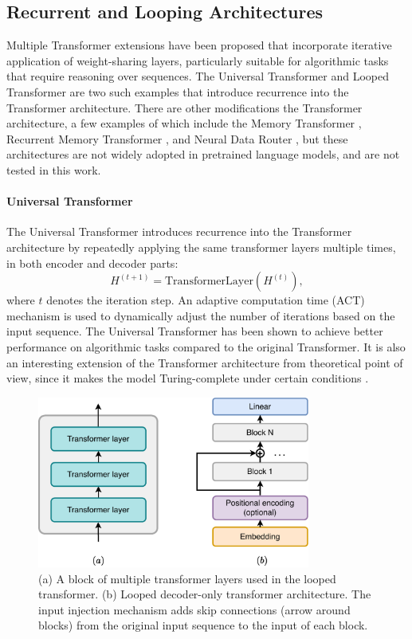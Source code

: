 \subsection{Recurrent and Looping Architectures}\label{subsec:recurrent_looping}

Multiple Transformer extensions have been proposed that incorporate iterative application of weight-sharing layers, particularly suitable for algorithmic tasks that require reasoning over sequences. The Universal Transformer and Looped Transformer are two such examples that introduce recurrence into the Transformer architecture. There are other modifications the Transformer architecture, a few examples of which include the Memory Transformer \parencite{burtsev_memory_2021}, Recurrent Memory Transformer \parencite{bulatov_recurrent_2022}, and Neural Data Router \parencite{csordas_neural_2021}, but these architectures are not widely adopted in pretrained language models, and are not tested in this work.

\paragraph{Universal Transformer}

The Universal Transformer \parencite{dehghani_universal_2018} introduces recurrence into the Transformer architecture by repeatedly applying the same transformer layers multiple times, in both encoder and decoder parts:
\begin{equation*}
    H^{(t+1)} = \text{TransformerLayer}(H^{(t)}),
\end{equation*}
where $t$ denotes the iteration step. An adaptive computation time (ACT) mechanism is used to dynamically adjust the number of iterations based on the input sequence. The Universal Transformer has been shown to achieve better performance on algorithmic tasks compared to the original Transformer. It is also an interesting extension of the Transformer architecture from theoretical point of view, since it makes the model Turing-complete under certain conditions \parencite{dehghani_universal_2018}.

\begin{figure}[h!]
    \centering
    \includegraphics[width=0.8\textwidth]{fig/looped_transformer.pdf}
    \caption{(a) A block of multiple transformer layers used in the looped transformer. (b) Looped decoder-only transformer architecture. The input injection mechanism adds skip connections (arrow around blocks) from the original input sequence to the input of each block.}
    \label{fig:looped_transformer}
\end{figure}

